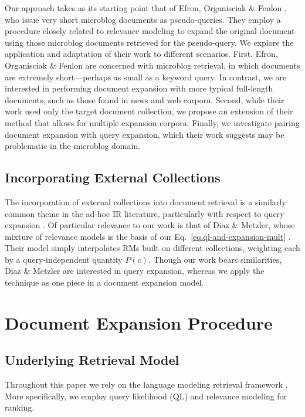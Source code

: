 \documentclass[sigconf]{acmart}
\begin{document}
Our approach takes as its starting point that of Efron, Organisciak \& Fenlon \cite{Efron2012}, who issue very short microblog documents as pseudo-queries. They employ a procedure closely related to relevance modeling \cite{Lavrenko2001} to expand the original document using those microblog documents retrieved for the pseudo-query. We explore the application and adaptation of their work to different scenarios. First, Efron, Organisciak \& Fenlon are concerned with microblog retrieval, in which documents are extremely short---perhaps as small as a keyword query. In contrast, we are interested in performing document expansion with more typical full-length documents, such as those found in news and web corpora. Second, while their work used only the target document collection, we propose an extension of their method that allows for multiple expansion corpora. Finally, we investigate pairing document expansion with query expansion, which their work suggests may be problematic in the microblog domain.

\subsection{Incorporating External Collections}\label{section.external.collections}

The incorporation of external collections into document retrieval is a similarly common theme in the ad-hoc IR literature, particularly with respect to query expansion \cite{Bendersky2012, Diaz2006, Li2007, Weerkamp2009, Xu2009}. Of particular relevance to our work is that of Diaz \& Metzler, whose mixture of relevance models is the basis of our Eq.~\ref{eq.ql-and-expansion-mult} \cite{Diaz2006}. Their model simply interpolates RMs built on different collections, weighting each by a query-independent quantity $P(c)$. Though our work bears similarities, Diaz \& Metzler are interested in query expansion, whereas we apply the technique as one piece in a document expansion model.

\section{Document Expansion Procedure}\label{section.expanding}

\subsection{Underlying Retrieval Model}\label{section.expanding.model}
Throughout this paper we rely on the language modeling retrieval framework \cite{Lafferty2001}. More specifically, we employ query likelihood (QL) and relevance modeling for ranking.
\end{document}
